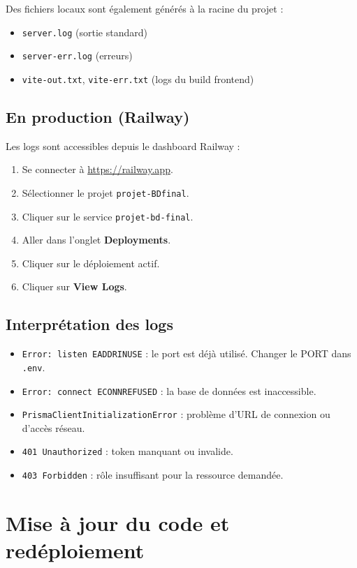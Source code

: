 \documentclass[12pt,a4paper]{report}
\begin{document}
Des fichiers locaux sont également générés à la racine du projet :
\begin{itemize}
    \item \texttt{server.log} (sortie standard)
    \item \texttt{server-err.log} (erreurs)
    \item \texttt{vite-out.txt}, \texttt{vite-err.txt} (logs du build frontend)
\end{itemize}

\subsection{En production (Railway)}
Les logs sont accessibles depuis le dashboard Railway :
\begin{enumerate}
    \item Se connecter à \url{https://railway.app}.
    \item Sélectionner le projet \texttt{projet-BDfinal}.
    \item Cliquer sur le service \texttt{projet-bd-final}.
    \item Aller dans l'onglet \textbf{Deployments}.
    \item Cliquer sur le déploiement actif.
    \item Cliquer sur \textbf{View Logs}.
\end{enumerate}

\subsection{Interprétation des logs}
\begin{itemize}
    \item \texttt{Error: listen EADDRINUSE} : le port est déjà utilisé. Changer le PORT dans \texttt{.env}.
    \item \texttt{Error: connect ECONNREFUSED} : la base de données est inaccessible.
    \item \texttt{PrismaClientInitializationError} : problème d'URL de connexion ou d'accès réseau.
    \item \texttt{401 Unauthorized} : token manquant ou invalide.
    \item \texttt{403 Forbidden} : rôle insuffisant pour la ressource demandée.
\end{itemize}

\section{Mise à jour du code et redéploiement}
\end{document}
